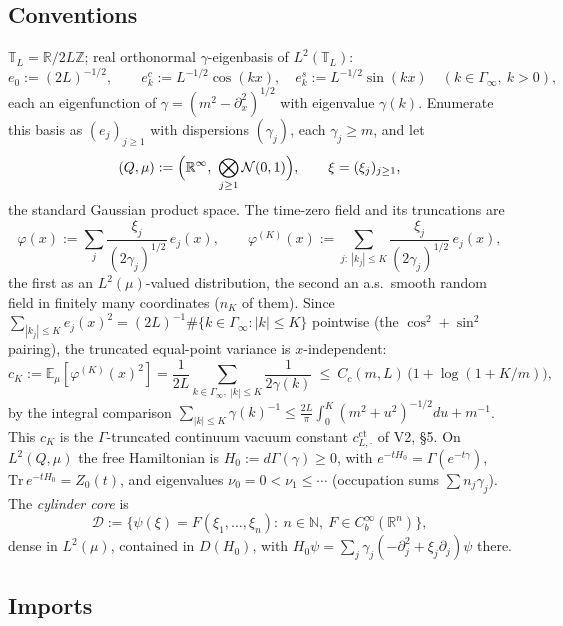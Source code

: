 \documentclass[11pt,a4paper]{article}
\theoremstyle{plain}
\theoremstyle{definition}
\newcommand{\R}{\mathbb{R}}
\newcommand{\Z}{\mathbb{Z}}
\newcommand{\T}{\mathbb{T}}
\newcommand{\E}{\mathbb{E}}
\newcommand{\D}{\mathcal D}
\newcommand{\Trace}{\mathrm{Tr}}
\newcommand{\muv}{\mu}
\newcommand{\Gam}{\Gamma}
\newcommand{\N}{\mathbb N}
\begin{document}
\subsection{Conventions}

$\T_L=\R/2L\Z$; real orthonormal $\gamma$-eigenbasis of $L^2(\T_L)$:
\[
 e_0:=(2L)^{-1/2},\qquad
 e^c_k:=L^{-1/2}\cos(kx),\quad e^s_k:=L^{-1/2}\sin(kx)\quad(k\in
 \Gamma_\infty,\ k>0),
\]
each an eigenfunction of $\gamma=(m^2-\partial_x^2)^{1/2}$ with eigenvalue
$\gamma(k)$. Enumerate this basis as $(e_j)_{j\ge1}$ with dispersions
$(\gamma_j)$, each $\gamma_j\ge m$, and let
\[
 (Q,\muv):=\Bigl(\R^\infty,\ \bigotimes_{j\ge1}\mathcal N(0,1)\Bigr),
 \qquad \xi=(\xi_j)_{j\ge1},
\]
the standard Gaussian product space. The time-zero field and its
truncations are
\begin{equation}
 \varphi(x):=\sum_{j}\frac{\xi_j}{(2\gamma_j)^{1/2}}\,e_j(x),\qquad
 \varphi^{(K)}(x):=\sum_{j:\ |k_j|\le K}\frac{\xi_j}{(2\gamma_j)^{1/2}}
 \,e_j(x),
 \label{eq:field}
\end{equation}
the first as an $L^2(\muv)$-valued distribution, the second an a.s.\ smooth
random field in finitely many coordinates ($n_K$ of them). Since
$\sum_{|k_j|\le K}e_j(x)^2=(2L)^{-1}\#\{k\in\Gamma_\infty:|k|\le K\}$
pointwise (the $\cos^2+\sin^2$ pairing), the truncated equal-point variance
is $x$-independent:
\begin{equation}
 c_K:=\E_\muv[\varphi^{(K)}(x)^2]
 =\frac1{2L}\sum_{k\in\Gamma_\infty,\ |k|\le K}\frac1{2\gamma(k)}
 \ \le\ C_c(m,L)\,\bigl(1+\log(1+K/m)\bigr),
 \label{eq:cK}
\end{equation}
by the integral comparison $\sum_{|k|\le K}\gamma(k)^{-1}\le
\tfrac{2L}\pi\int_0^K(m^2+u^2)^{-1/2}du+m^{-1}$. This $c_K$ is the
$\Gamma$-truncated continuum vacuum constant $c^{\mathrm{ct}}_{L,\cdot}$ of
V2, \S5. On $L^2(Q,\muv)$ the free Hamiltonian is
$H_0:=d\Gam(\gamma)\ge0$, with $e^{-tH_0}=\Gam(e^{-t\gamma})$,
$\Trace\,e^{-tH_0}=Z_0(t)$, and eigenvalues
$\nu_0=0<\nu_1\le\cdots$ (occupation sums $\sum n_j\gamma_j$). The
\emph{cylinder core} is
\[
 \D:=\bigl\{\psi(\xi)=F(\xi_1,\dots,\xi_n):\ n\in\N,\
 F\in C^\infty_b(\R^n)\bigr\},
\]
dense in $L^2(\muv)$, contained in $D(H_0)$, with
$H_0\psi=\sum_j\gamma_j(-\partial_j^2+\xi_j\partial_j)\psi$ there.

\subsection{Imports}\label{sec:imports}
\end{document}
